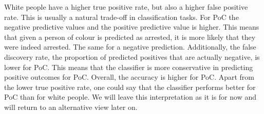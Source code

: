White people have a higher true positive rate, but also a higher false positive rate. This is usually a natural trade-off in classification tasks. For PoC the negative predictive values and the positive predictive value is higher. This means that given a person of colour is predicted as arrested, it is more likely that they were indeed arrested. The same for a negative prediction. Additionally, the false discovery rate, the proportion of predicted positives that are actually negative, is lower for PoC. This means that the classifier is more conservative in predicting positive outcomes for PoC. Overall, the accuracy is higher for PoC.
Apart from the lower true positive rate, one could say that the classifier performs better for PoC than for white people. We will leave this interpretation as it is for now and will return to an alternative view later on.


